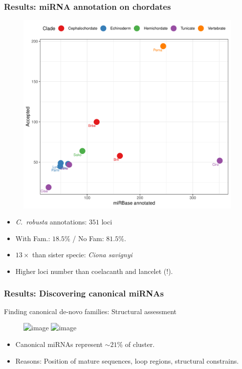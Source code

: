 \begin{frame}[t]
    \frametitle{Results: miRNA annotation on chordates}
    \begin{figure}[h!]
        \centering
        \includegraphics[width=.45\linewidth]{Figures/annotated_vs_accepted} %
    \end{figure}
    \begin{itemize}[<+->]
        \item \textit{C.\ robusta} annotations: $351$ loci
        \item With Fam.: $18.5$\% / No Fam: $81.5$\%.
        \item $13\times$ than sister specie: \textit{Ciona savignyi}
        \item Higher loci number than coelacanth and lancelet (!).
    \end{itemize}
\end{frame}

\begin{frame}[t]
    \frametitle{Results: Discovering canonical miRNAs}
    Finding canonical de-novo families: Structural assessment
    \begin{figure}[h!]
        \centering
        \includegraphics<1>[width=\linewidth]{Figures/evaluation_annotation_mirbase1} %
        \includegraphics<2>[width=\linewidth]{Figures/evaluation_annotation_mirbase2} %
    \end{figure}
     \begin{itemize}[<+->]
         \item Canonical miRNAs represent $\sim21$\% of cluster.
         \item Reasons: Position of mature sequences, loop regions, structural constrains.
     \end{itemize}
\end{frame}

